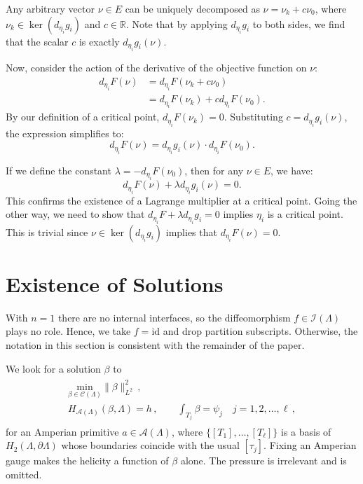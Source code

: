 \documentclass[11pt]{article}
\theoremstyle{plain}
\theoremstyle{definition}
\theoremstyle{remark}
\newcommand{\ST}{\Lambda}
\newcommand{\I}{\mathcal{I}(\ST)}
\begin{document}
Any arbitrary vector $\nu \in E$ can be uniquely decomposed as $\nu = \nu_k + c\nu_0$, where $\nu_k \in \ker(d_{\eta_i} g_i)$ and $c \in \mathbb{R}$. Note that by applying $d_{\eta_i} g_i$ to both sides, we find that the scalar $c$ is exactly $d_{\eta_i} g_i(\nu)$.

Now, consider the action of the derivative of the objective function on $\nu$:
\begin{align*}
    d_{\eta_i} F(\nu) &= d_{\eta_i} F(\nu_k + c\nu_0) \\
    &= d_{\eta_i} F(\nu_k) + c d_{\eta_i} F(\nu_0).
\end{align*}
By our definition of a critical point, $d_{\eta_i} F(\nu_k) = 0$. Substituting $c = d_{\eta_i} g_i(\nu)$, the expression simplifies to:
\[ d_{\eta_i} F(\nu) = d_{\eta_i} g_i(\nu) \cdot d_{\eta_i} F(\nu_0). \]

If we define the constant $\lambda = -d_{\eta_i} F(\nu_0)$, then for any $\nu \in E$, we have:
\[ d_{\eta_i} F(\nu) + \lambda d_{\eta_i} g_i(\nu) = 0. \]
This confirms the existence of a Lagrange multiplier at a critical point. Going the other way, we need to show that \(d_{\eta_i} F + \lambda d_{\eta_i} g_i = 0\) implies \(\eta_i \) is a critical point. This is trivial since \(\nu \in \ker (d_{\eta_i} g_i )\) implies that \(d_{\eta_i} F(\nu) = 0\). 





\section{Existence of Solutions} \label{append:exist}


With \(n=1\) there are no internal interfaces, so the diffeomorphism \(f\in\I\) plays no role. Hence, we take \(f=\mathrm{id}\) and drop partition subscripts. Otherwise, the notation in this section is consistent with the remainder of the paper. 



 We look for a solution \(\beta\) to
\begin{align}  \label{problem:a_only}
    \begin{gathered} 
    \underset{\beta  \in  \mathcal{C} ( \ST ) }{ \text{min} }  \| \beta   \|_{L^2}^2  \, , \\
    H_{\mathscr{A}(\ST)} (\beta,  \ST) = h \, , \qquad \int_{T_{j}} \beta  = \psi_{j} \quad j = 1,2, \dots, \ell \, ,
    \end{gathered}
\end{align}
for an Amperian primitive \(a \in \mathscr{A}(\ST)\), where \(\{[T_1], \dots, [T_\ell]\}\) is a basis of \(H_2(\ST,\partial\ST)\) whose boundaries coincide with the usual \([\tau_j]\). Fixing an Amperian gauge makes the helicity a function of \(\beta \) alone. The pressure is irrelevant and is omitted.
\end{document}
